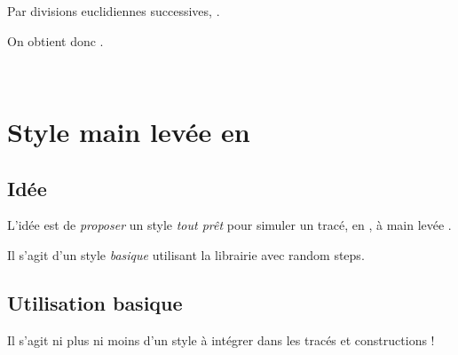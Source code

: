 \documentclass{article}
\newcommand\ctex[1]{\tcbox[vignettelatex]{#1}}
\begin{document}
\begin{codesortie}

\medskip

Par divisions euclidiennes successives, .

\medskip


\medskip

On obtient donc .

\vspace{1.5cm}

~
\end{codesortie}

\newpage

\section{Style \og main levée \fg{} en \TikZ}\label{mainlevee}

\subsection{Idée}

\begin{codeidee}
L'idée est de \textit{proposer} un style \textit{tout prêt} pour simuler un tracé, en \TikZ, à \og main levée \fg.

Il s'agit d'un style \textit{basique} utilisant la librairie \ctex{decorations} avec \textsf{random steps}.
\end{codeidee}

\begin{codetex}
\end{codetex}

\subsection{Utilisation basique}

\begin{codeinfo}
Il s'agit ni plus ni moins d'un style \TikZ{} à intégrer dans les tracés et constructions \TikZ !
\end{codeinfo}
\end{document}

